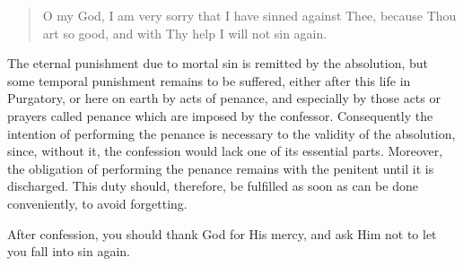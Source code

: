 
\begin{quote}

O my God, I am very sorry that I have sinned against Thee, because Thou art so good, and with Thy help I will not sin again.

\end{quote}


The eternal punishment due to mortal sin is remitted by the absolution, but some temporal punishment remains to be suffered, either after this life in Purgatory, or here on earth by acts of penance, and especially by those acts or prayers called penance which are imposed by the confessor. Consequently the intention of performing the penance is necessary to the validity of the absolution, since, without it, the confession would lack one of its essential parts. Moreover, the obligation of performing the penance remains with the penitent until it is discharged. This duty should, therefore, be fulfilled as soon as can be done conveniently, to avoid forgetting.

\bigskip


After confession, you should thank God for His mercy, and ask Him not to let you fall into sin again.


%
